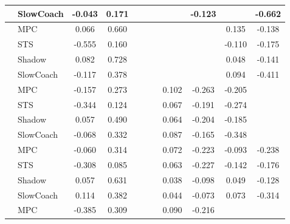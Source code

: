 \begin{tabular}{|l|l|*{9}{c|}}
                                                           & SlowCoach &   -0.043 &     0.171 &        &     &     &     &  -0.123 &      &   -0.662 \\
\midrule
[True, True, False, False, False, False, False, True, True] & MPC &    0.066 &     0.660 &        &     &     &     &      &   0.135 &   -0.138 \\
                                                           & STS &   -0.555 &     0.160 &        &     &     &     &      &  -0.110 &   -0.175 \\
                                                           & Shadow &    0.082 &     0.728 &        &     &     &     &      &   0.048 &   -0.141 \\
                                                           & SlowCoach &   -0.117 &     0.378 &        &     &     &     &      &   0.094 &   -0.411 \\
\midrule
[True, True, False, False, False, True, True, True, False] & MPC &   -0.157 &     0.273 &        &     &     &  0.102 &  -0.263 &  -0.205 &       \\
                                                           & STS &   -0.344 &     0.124 &        &     &     &  0.067 &  -0.191 &  -0.274 &       \\
                                                           & Shadow &    0.057 &     0.490 &        &     &     &  0.064 &  -0.204 &  -0.185 &       \\
                                                           & SlowCoach &   -0.068 &     0.332 &        &     &     &  0.087 &  -0.165 &  -0.348 &       \\
\midrule
[True, True, False, False, False, True, True, True, True] & MPC &   -0.060 &     0.314 &        &     &     &  0.072 &  -0.223 &  -0.093 &   -0.238 \\
                                                           & STS &   -0.308 &     0.085 &        &     &     &  0.063 &  -0.227 &  -0.142 &   -0.176 \\
                                                           & Shadow &    0.057 &     0.631 &        &     &     &  0.038 &  -0.098 &   0.049 &   -0.128 \\
                                                           & SlowCoach &    0.114 &     0.382 &        &     &     &  0.044 &  -0.073 &   0.073 &   -0.314 \\
\midrule
[True, True, False, False, False, True, True, False, False] & MPC &   -0.385 &     0.309 &        &     &     &  0.090 &  -0.216 &      &       \\

\end{tabular}
